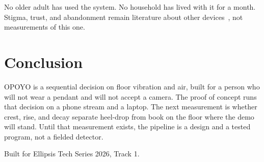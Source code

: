 \documentclass[sigconf]{acmart}
\begin{document}
No older adult has used the system. No household has lived with it for a month. Stigma, trust, and abandonment remain literature about other devices~\cite{hawley2014}, not measurements of this one.

\section{Conclusion}

OPOYO is a sequential decision on floor vibration and air, built for a person who will not wear a pendant and will not accept a camera. The proof of concept runs that decision on a phone stream and a laptop. The next measurement is whether crest, rise, and decay separate heel-drop from book on the floor where the demo will stand. Until that measurement exists, the pipeline is a design and a tested program, not a fielded detector.

\begin{acks}
Built for Ellipsis Tech Series 2026, Track 1.
\end{acks}



\end{document}
